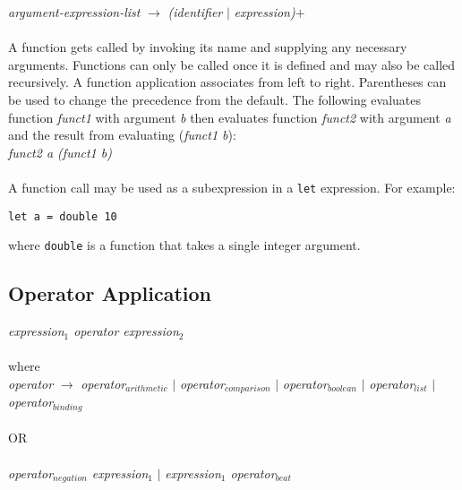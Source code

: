     \emph{argument-expression-list} $\rightarrow$ \emph{(identifier} $|$ \emph{expression)}$+$ \\ \\ 
    A function gets called by invoking its name and supplying any necessary arguments. Functions can only be called once it is defined and may also be called recursively. A function application associates from left to right. Parentheses can be used to change the precedence from the default. The following evaluates function \emph{funct1} with argument \emph{b} then 
    evaluates function \emph{funct2} with argument \emph{a} and the result from evaluating (\emph{funct1 b}): \\
    
    \emph{funct2 a (funct1 b)}\\ \\
A function call may be used as a subexpression in a \texttt{let} expression. For example:
\begin{verbatim}
let a = double 10
\end{verbatim}
where \texttt{double} is a function that takes a single integer argument. 

\subsection{Operator Application}
\label{sec:operator application}
    \emph{expression$_{1}$  operator  expression$_{2}$}\\ \\
    where\\
    
    \emph{operator} $\rightarrow$ 
        \emph{operator$_{arithmetic}$} $|$
        \emph{operator$_{comparison}$}  $|$ 
        \emph{operator$_{boolean}$}  $|$
        \emph{operator$_{list}$}  $|$
        \emph{operator$_{binding}$} \\ \\
OR\\ \\
          \emph{operator$_{negation}$  expression$_{1}$} $|$
					\emph{expression$_{1}$ operator$_{beat}$}\\ \\
    
